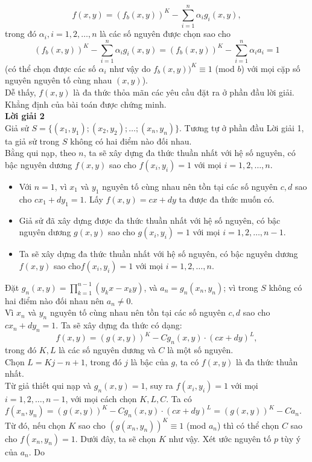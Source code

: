 \begin{bt}
{		$$ f(x,y) =  (f_b(x,y))^K -\sum_{i=1}^n\alpha_ig_i(x,y),$$
		trong đó $\alpha_i,i=1,2,\ldots,n$ là các số nguyên được chọn sao cho
		$$  (f_b(x,y))^K -\sum_{i=1}^n\alpha_ig_i(x,y) =  (f_b(x,y))^K -\sum_{i=1}^n\alpha_ia_i =1 $$
		(có thể chọn được các số $\alpha_i$ như vậy do $f_b(x,y))^K \equiv 1$ (mod $b$) với mọi cặp số nguyên nguyên tố cùng nhau $(x,y)$).\\
		Dễ thấy, $f(x,y)$ là đa thức thỏa mãn các yêu cầu đặt ra ở phần đầu lời giải.\\
		Khẳng định của bài toán được chứng minh.\\
		{\bf Lời giải 2} \\
		Giả sử  $S=\{(x_1,y_1);(x_2,y_2);\ldots ; (x_n,y_n)\}$. Tương tự ở phần đầu Lời giải 1, ta giả sử trong $S$ không có hai điểm nào đối nhau.\\
		Bằng qui nạp, theo $n$, ta sẽ xây dựng đa thức thuần nhất với hệ số nguyên, có bậc nguyên dương $f(x,y)$ sao cho $f(x_i,y_i) =1$ với mọi $i=1,2,\ldots , n$.
		\begin{itemize}
			\item Với $n=1$, vì $x_1$ và $y_1$ nguyên tố cùng nhau nên tồn tại các số nguyên $c,d$ sao cho $cx_1+dy_1=1$. Lấy $f(x,y) = cx+dy$ ta được đa thức muốn có.
			\item Giả sử đã xây dựng được đa thức thuần nhất với hệ số nguyên, có bậc nguyên dương $g(x,y)$ sao cho $g(x_i,y_i) = 1$ với mọi $i = 1,2,\ldots,n-1$.
			\item Ta sẽ xây dựng đa thức thuần nhất với hệ số nguyên, có bậc nguyên dương $f(x,y)$ sao cho$f(x_i,y_i) = 1$ với mọi $i=1,2,\ldots , n$.
		\end{itemize}
		Đặt $g_n(x,y) = \prod_{k=1}^{n-1}(y_kx-x_ky)$, và $a_n = g_n(x_n,y_n)$; vì trong $S$ không có hai điểm nào đối nhau nên $a_n \ne 0$.\\
		Vì $x_n$ và $y_n$ nguyên tố cùng nhau nên tồn tại các số nguyên $c,d$ sao cho $cx_n+dy_n = 1$. Ta sẽ xây dựng đa thức có dạng:
		$$ f(x,y) = (g(x,y))^K-Cg_n(x,y)\cdot (cx+dy)^L, $$
		trong đó $K,L$ là các số nguyên dương và $C$ là một số nguyên.\\
		Chọn $L=Kj-n+1$, trong đó $j$ là bậc của $g$, ta có $f(x,y)$ là đa thức thuần nhất.\\
		Từ giả thiết qui nạp và $g_n(x,y) =1$, suy ra $f(x_i,y_i) =1$ với mọi $i=1,2,\ldots,n-1$, với mọi cách chọn $K,L,C$. Ta có\\
		$f(x_n,y_n) = (g(x,y))^K-Cg_n(x,y)\cdot (cx+dy)^L=(g(x,y))^K-Ca_n.$\\
		Từ đó, nếu chọn $K$ sao cho $(g(x_n,y_n))^K \equiv 1$ (mod $a_n$) thì có thể chọn $C$ sao cho $f(x_n,y_n) =1$. Dưới đây, ta sẽ chọn $K$ như vậy. Xét ước nguyên tố $p$ tùy ý của $a_n$. Do 
}
\end{bt}

